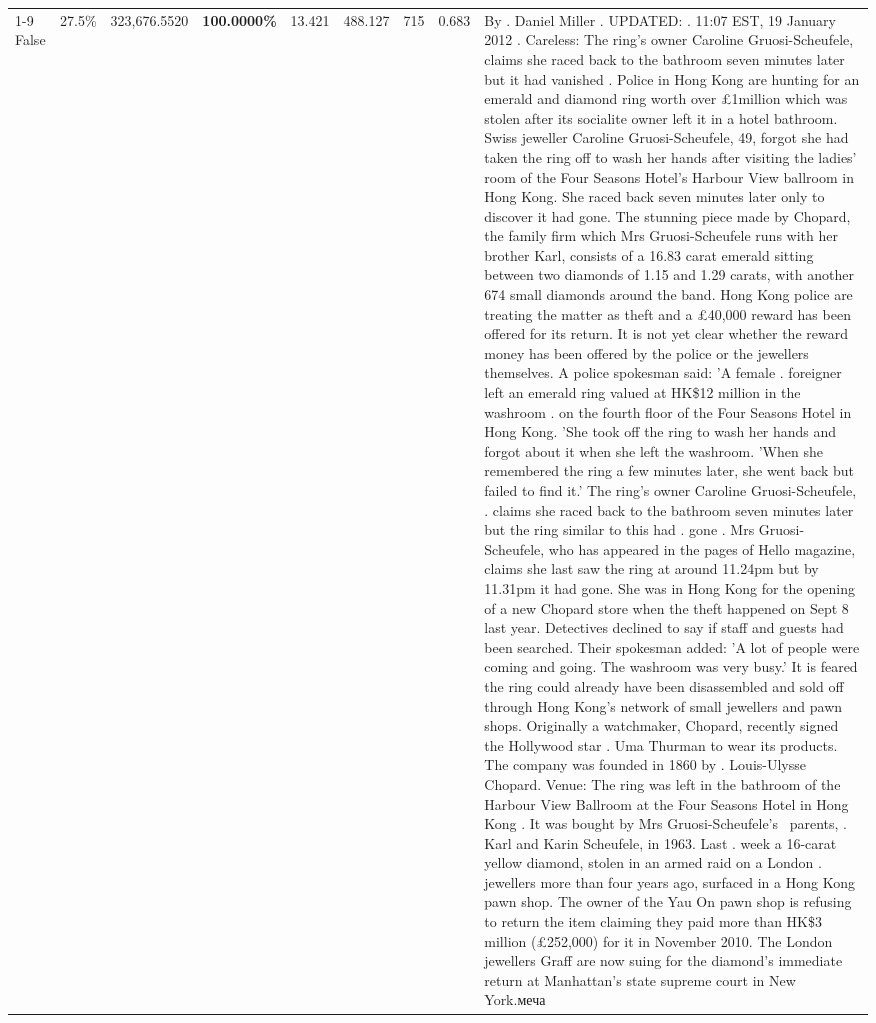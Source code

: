 \begin{table}[H]
\begin{tabular}{lllrlllll}
\cline{1-9}
False & 27.5\% & 323,676.5520 & \bfseries \color{red} 100.0000\% & 13.421 & 488.127 & 715 & 0.683 & By . Daniel Miller . UPDATED: . 11:07 EST, 19 January 2012 . Careless: The ring's owner Caroline Gruosi-Scheufele, claims she raced back to the bathroom seven minutes later but it had vanished . Police in Hong Kong are hunting for an emerald and diamond ring worth over £1million which was stolen after its socialite owner left it in a hotel bathroom. Swiss jeweller Caroline Gruosi-Scheufele, 49, forgot she had taken the ring off to wash her hands after visiting the ladies' room of the Four Seasons Hotel's Harbour View ballroom in Hong Kong. She raced back seven minutes later only to discover it had gone. The stunning piece made by Chopard, the family firm which Mrs Gruosi-Scheufele runs with her brother Karl, consists of a 16.83 carat emerald sitting between two diamonds of 1.15 and 1.29 carats, with another 674 small diamonds around the band. Hong Kong police are treating the matter as theft and a £40,000 reward has been offered for its return. It is not yet clear whether the reward money has been offered by the police or the jewellers themselves. A police spokesman said: 'A female . foreigner left an emerald ring valued at HK\$12 million in the washroom . on the fourth floor of the Four Seasons Hotel in Hong Kong. 'She took off the ring to wash her hands and forgot about it when she left the washroom. 'When she remembered the ring a few minutes later, she went back but failed to find it.' The ring's owner Caroline Gruosi-Scheufele, . claims she raced back to the bathroom seven minutes later but the ring similar to this had . gone . Mrs Gruosi-Scheufele, who has appeared in the pages of Hello magazine, claims she last saw the ring at around 11.24pm but by 11.31pm it had gone. She was in Hong Kong for the opening of a new Chopard store when the theft happened on Sept 8 last year. Detectives declined to say if staff and guests had been searched. Their spokesman added: 'A lot of people were coming and going. The washroom was very busy.' It is feared the ring could already have been disassembled and sold off through Hong Kong's network of small jewellers and pawn shops. Originally a watchmaker, Chopard, recently signed the Hollywood star . Uma Thurman to wear its products. The company was founded in 1860 by . Louis-Ulysse Chopard. Venue: The ring was left in the bathroom of the Harbour View Ballroom at the Four Seasons Hotel in Hong Kong . It was bought by Mrs Gruosi-Scheufele's  parents, . Karl and Karin Scheufele, in 1963. Last . week a 16-carat yellow diamond, stolen in an armed raid on a London . jewellers more than four years ago, surfaced in a Hong Kong pawn shop. The owner of the Yau On pawn shop is refusing to return the item claiming they paid more than HK\$3 million (£252,000) for it in November 2010. The London jewellers Graff are now suing for the diamond’s immediate return at Manhattan’s state supreme court in New York.меча \\

\end{tabular}
\end{table}
